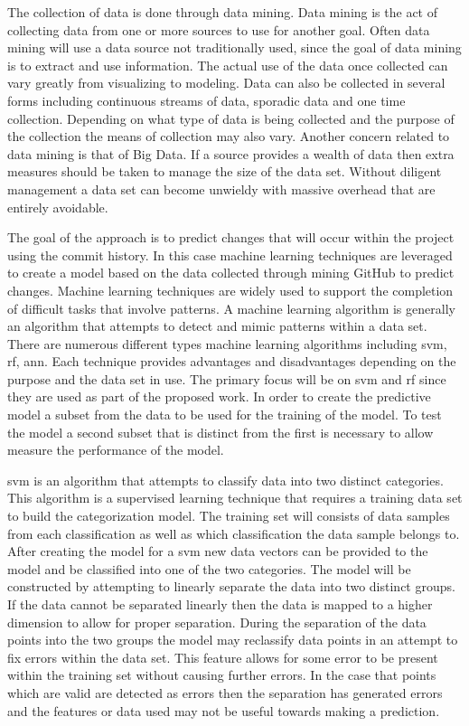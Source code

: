 The collection of data is done through data mining. Data mining is the act of collecting data from one or more sources to use for another goal. Often data mining will use a data source not traditionally used, since the goal of data mining is to extract and use information. The actual use of the data once collected can vary greatly from visualizing to modeling. Data can also be collected in several forms including continuous streams of data, sporadic data and one time collection. Depending on what type of data is being collected and the purpose of the collection the means of collection may also vary. Another concern related to data mining is that of Big Data. If a source provides a wealth of data then extra measures should be taken to manage the size of the data set. Without diligent management a data set can become unwieldy with massive overhead that are entirely avoidable.

The goal of the approach is to predict changes that will occur within the project using the commit history. In this case machine learning techniques are leveraged to create a model based on the data collected through mining GitHub to predict changes. Machine learning techniques are widely used to support the completion of difficult tasks that involve patterns. A machine learning algorithm is generally an algorithm that attempts to detect and mimic patterns within a data set. There are numerous different types machine learning algorithms including \gls{svm}, \gls{rf}, \gls{ann}. Each technique provides advantages and disadvantages depending on the purpose and the data set in use. The primary focus will be on \gls{svm} and \gls{rf} since they are used as part of the proposed work. In order to create the predictive model a subset from the data to be used for the training of the model. To test the model a second subset that is distinct from the first is necessary to allow measure the performance of the model.

\gls{svm} is an algorithm that attempts to classify data into two distinct categories. This algorithm is a supervised learning technique that requires a training data set to build the categorization model. The training set will consists of data samples from each classification as well as which classification the data sample belongs to. After creating the model for a \gls{svm} new data vectors can be provided to the model and be classified into one of the two categories. The model will be constructed by attempting to linearly separate the data into two distinct groups. If the data cannot be separated linearly then the data is mapped to a higher dimension to allow for proper separation. During the separation of the data points into the two groups the model may reclassify data points in an attempt to fix errors within the data set. This feature allows for some error to be present within the training set without causing further errors. In the case that points which are valid are detected as errors then the separation has generated errors and the features or data used may not be useful towards making a prediction.%

